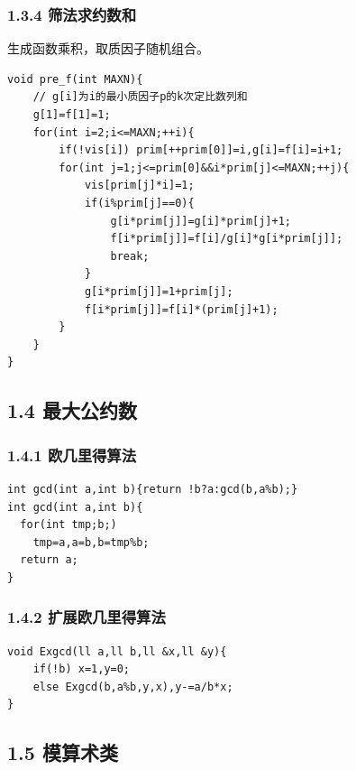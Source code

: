 \documentclass[UTF8,a4paper,11pt]{ctexart}
\begin{document}
\subsubsection*{1.3.4 筛法求约数和}
生成函数乘积，取质因子随机组合。
\begin{Verbatim}[fontsize=\small,frame=single,breaklines=true,breakanywhere=true]
void pre_f(int MAXN){
    // g[i]为i的最小质因子p的k次定比数列和
    g[1]=f[1]=1;
    for(int i=2;i<=MAXN;++i){
        if(!vis[i]) prim[++prim[0]]=i,g[i]=f[i]=i+1;
        for(int j=1;j<=prim[0]&&i*prim[j]<=MAXN;++j){
            vis[prim[j]*i]=1;
            if(i%prim[j]==0){
                g[i*prim[j]]=g[i]*prim[j]+1;
                f[i*prim[j]]=f[i]/g[i]*g[i*prim[j]];
                break;
            }
            g[i*prim[j]]=1+prim[j];
            f[i*prim[j]]=f[i]*(prim[j]+1);
        }
    }
}
\end{Verbatim}
\subsection*{1.4 最大公约数}

\subsubsection*{1.4.1 欧几里得算法}

\begin{Verbatim}[fontsize=\small,frame=single,breaklines=true,breakanywhere=true]
int gcd(int a,int b){return !b?a:gcd(b,a%b);}
int gcd(int a,int b){
  for(int tmp;b;)
    tmp=a,a=b,b=tmp%b;
  return a;
}
\end{Verbatim}

\subsubsection*{1.4.2 扩展欧几里得算法}

\begin{Verbatim}[fontsize=\small,frame=single,breaklines=true,breakanywhere=true]
void Exgcd(ll a,ll b,ll &x,ll &y){
    if(!b) x=1,y=0;
    else Exgcd(b,a%b,y,x),y-=a/b*x;
}
\end{Verbatim}

\subsection*{1.5 模算术类}
\end{document}
